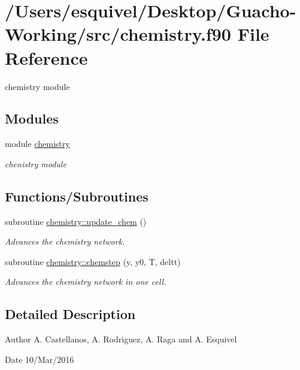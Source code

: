 \hypertarget{chemistry_8f90}{}\section{/\+Users/esquivel/\+Desktop/\+Guacho-\/\+Working/src/chemistry.f90 File Reference}
\label{chemistry_8f90}


chemistry module  


\subsection*{Modules}
\begin{DoxyCompactItemize}
\item 
module \hyperlink{namespacechemistry}{chemistry}
\begin{DoxyCompactList}\small\item\em chenistry module \end{DoxyCompactList}\end{DoxyCompactItemize}
\subsection*{Functions/\+Subroutines}
\begin{DoxyCompactItemize}
\item 
subroutine \hyperlink{namespacechemistry_a33dc05889bfc2d0361a4a3f95086f68c}{chemistry\+::update\+\_\+chem} ()
\begin{DoxyCompactList}\small\item\em Advances the chemistry network. \end{DoxyCompactList}\item 
subroutine \hyperlink{namespacechemistry_ab808252fa02b3bfb1ac29ed7b2f5122e}{chemistry\+::chemstep} (y, y0, T, deltt)
\begin{DoxyCompactList}\small\item\em Advances the chemistry network in one cell. \end{DoxyCompactList}\end{DoxyCompactItemize}


\subsection{Detailed Description}
\begin{DoxyAuthor}{Author}
A. Castellanos, A. Rodriguez, A. Raga and A. Esquivel 
\end{DoxyAuthor}
\begin{DoxyDate}{Date}
10/\+Mar/2016 
\end{DoxyDate}
